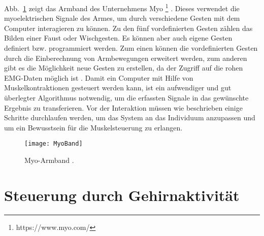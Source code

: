 \newline \newline
Abb.~\ref{fig:MyoBand} zeigt das Armband des Unternehmens Myo%
\footnote{https://www.myo.com/}
%
. Dieses verwendet die myoelektrischen Signale des Armes, um durch verschiedene Gesten mit dem Computer interagieren zu können. Zu den fünf vordefinierten Gesten zählen \zB das Bilden einer Faust oder Wischgesten. Es können aber auch eigene Gesten definiert bzw. programmiert werden. Zum einen können die vordefinierten Gesten durch die Einberechnung von Armbewegungen erweitert werden, zum anderen gibt es die Möglichkeit neue Gesten zu erstellen, da der Zugriff auf die rohen EMG-Daten möglich ist \cite{myoBand2}.%
\newline \newline \newline 
Damit ein Computer mit Hilfe von Muskelkontraktionen gesteuert werden kann, ist ein aufwendiger und gut überlegter Algorithmus notwendig, um die erfassten Signale in das gewünschte Ergebnis zu transferieren. Vor der Interaktion müssen wie beschrieben einige Schritte durchlaufen werden, um das System an das Individuum anzupassen und um ein Bewusstsein für die Muskelsteuerung zu erlangen.
%
%
\begin{figure}
\centering
\texttt{[image: MyoBand]}
\caption{Myo-Armband \cite{myoBand}.}
\label{fig:MyoBand}
\end{figure}
%
%

\section{Steuerung durch Gehirnaktivität}

